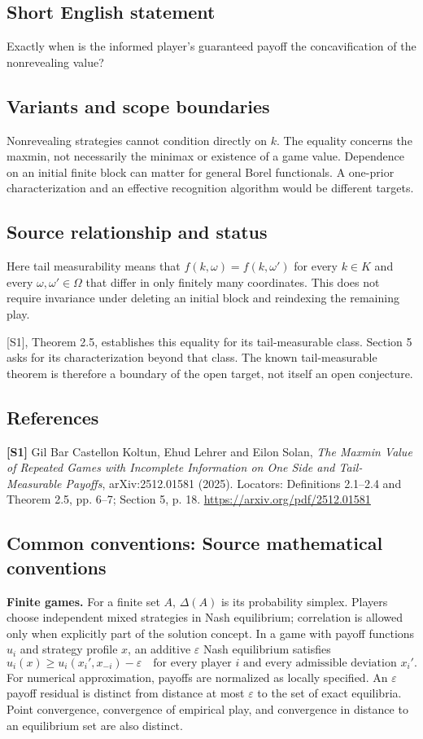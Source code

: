 \documentclass[11pt,a4paper]{article}
\begin{document}
\subsection*{Short English statement}
Exactly when is the informed player's guaranteed payoff the concavification of the nonrevealing value?
\subsection*{Variants and scope boundaries}
Nonrevealing strategies cannot condition directly on $k$. The equality concerns the maxmin, not necessarily the minimax or existence of a game value. Dependence on an initial finite block can matter for general Borel functionals. A one-prior characterization and an effective recognition algorithm would be different targets.
\subsection*{Source relationship and status}
Here tail measurability means that $f(k,\omega)=f(k,\omega')$ for every $k\in K$ and every $\omega,\omega'\in\Omega$ that differ in only finitely many coordinates. This does not require invariance under deleting an initial block and reindexing the remaining play.

[S1], Theorem 2.5, establishes this equality for its tail-measurable class. Section 5 asks for its characterization beyond that class. The known tail-measurable theorem is therefore a boundary of the open target, not itself an open conjecture.
\subsection*{References}
\begingroup\footnotesize\raggedright
\textbf{[S1]} Gil Bar Castellon Koltun, Ehud Lehrer and Eilon Solan, \emph{The Maxmin Value of Repeated Games with Incomplete Information on One Side and Tail-Measurable Payoffs}, arXiv:2512.01581 (2025). Locators: Definitions 2.1--2.4 and Theorem 2.5, pp. 6--7; Section 5, p. 18. \url{https://arxiv.org/pdf/2512.01581}
\par\endgroup

\subsection*{Common conventions: Source mathematical conventions}

\textbf{Finite games.} For a finite set $A$, $\Delta(A)$ is its probability
simplex. Players choose independent mixed strategies in Nash equilibrium;
correlation is allowed only when explicitly part of the solution concept.
In a game with payoff functions $u_i$ and strategy profile $x$, an additive
$\varepsilon$ Nash equilibrium satisfies
\[
 u_i(x)\geq u_i(x_i',x_{-i})-\varepsilon
 \quad\text{for every player $i$ and every admissible deviation $x_i'$}.
\]
For numerical approximation, payoffs are normalized as locally specified.
An $\varepsilon$ payoff residual is distinct from distance at most
$\varepsilon$ to the set of exact equilibria. Point convergence, convergence
of empirical play, and convergence in distance to an equilibrium set are
also distinct.
\end{document}
